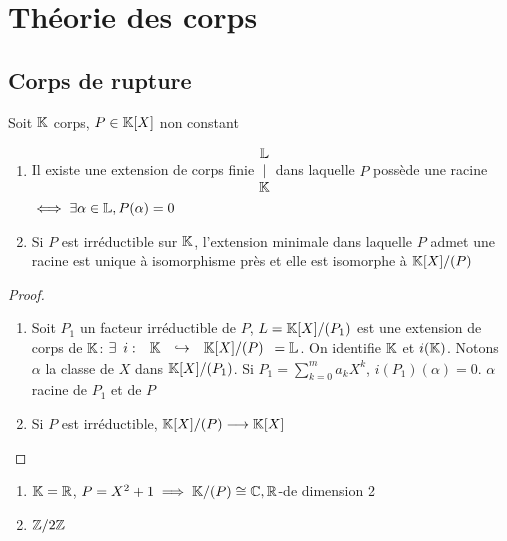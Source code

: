 \documentclass[]{report}
\begin{document}
    \chapter{Théorie des corps}

    \section{Corps de rupture}

    \begin{tm}{}{}
        Soit $\mathbb{K}$ corps, $P\in \mathbb{K}[X]$ non constant
        \begin{enumerate}
            \item Il existe une extension de corps finie $\begin{matrix}
                \mathbb{L}\\
                |\\
                \mathbb{K}
            \end{matrix}$ dans laquelle $P$ possède une racine $\iff \exists \alpha\in \mathbb{L},P(\alpha)=0$
            \item Si $P$ est irréductible sur $\mathbb{K}$, l'extension minimale dans laquelle $P$ admet une racine est unique à isomorphisme près et elle est isomorphe à $\mathbb{K}[X]/(P)$
        \end{enumerate}
    \end{tm}

    \begin{proof}
        \begin{enumerate}
            \item Soit $P_1$ un facteur irréductible de $P$, $L=\mathbb{K}[X]/(P_1)$ est une extension de corps de $\mathbb{K}$: $\exists \begin{array}{ccccc} i : & \mathbb{K} & \hookrightarrow & \mathbb{K}[X]/(P) \end{array}=\mathbb{L}$. On identifie $\mathbb{K}$ et $i(\mathbb{K})$. Notons $\alpha$ la classe de $X$ dans $\mathbb{K}[X]/(P_1)$. Si $P_1=\sum_{k=0}^{m} a_kX^k$, $i(P_1)(\alpha)=0$. $\alpha$ racine de $P_1$ et de $P$
            \item Si $P$ est irréductible, $\mathbb{K}[X]/(P) \longrightarrow \mathbb{K}[X]$
        \end{enumerate}
    \end{proof}

    \begin{ex}{}{}
        \begin{enumerate}
            \item $\mathbb{K}=\mathbb{R}$, $P=X^2+1\implies \mathbb{K} /(P)\cong \mathbb{C}, \mathbb{R}$-\ev de dimension 2
            \item $\mathbb{Z}/2\mathbb{Z}$
        \end{enumerate}
    \end{ex}
\end{document}
